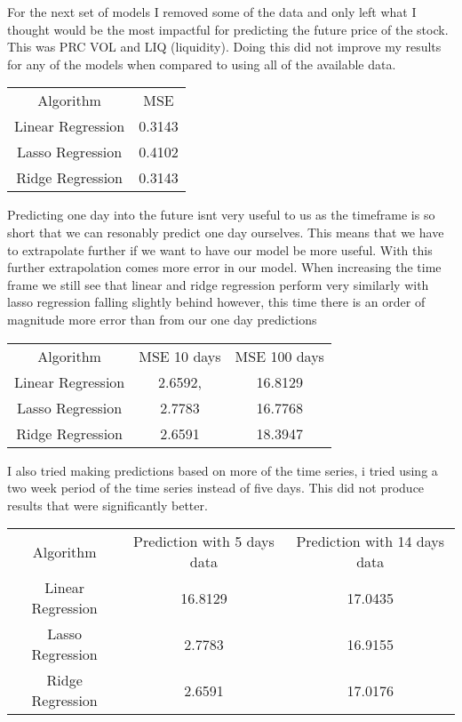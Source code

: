 \documentclass{report}
\begin{document}
For the next set of models I removed some of the data and only left what I thought would be the most impactful for predicting the future price of the stock.
This was PRC VOL and LIQ (liquidity).
Doing this did not improve my results for any of the models when compared to using all of the available data.

\begin{minipage} {\linewidth}
\bigskip
\centering
{}
\begin{tabular}{c c}
    Algorithm & MSE \\
    Linear Regression & 0.3143 \\
    Lasso Regression & 0.4102 \\
    Ridge Regression & 0.3143
\end{tabular}
\bigskip
\end{minipage}

Predicting one day into the future isnt very useful to us as the timeframe is so short that we can resonably predict one day ourselves. This means that we have to extrapolate further if we want to have our model be more useful.
With this further extrapolation comes more error in our model.
When increasing the time frame we still see that linear and ridge regression perform very similarly with lasso regression falling slightly behind however, this time there is an order of magnitude more error than from our one day predictions

\begin{minipage} {\linewidth}
\bigskip
\centering
{}
\begin{tabular}{c c c}
    Algorithm & MSE 10 days & MSE 100 days \\
    Linear Regression & 2.6592, & 16.8129 \\
    Lasso Regression & 2.7783 & 16.7768 \\
    Ridge Regression & 2.6591 & 18.3947
\end{tabular}
\bigskip
\end{minipage}

I also tried making predictions based on more of the time series, i tried using a two week period of the time series instead of five days. This did not produce results that were significantly better.

\begin{minipage} {\linewidth}
\bigskip
\centering
{}
\begin{tabular}{c c c}
    Algorithm & Prediction with 5 days data & Prediction with 14 days data \\
    Linear Regression & 16.8129 & 17.0435\\
    Lasso Regression & 2.7783 & 16.9155\\
    Ridge Regression & 2.6591 & 17.0176
\end{tabular}
\bigskip
\end{minipage}
\end{document}
